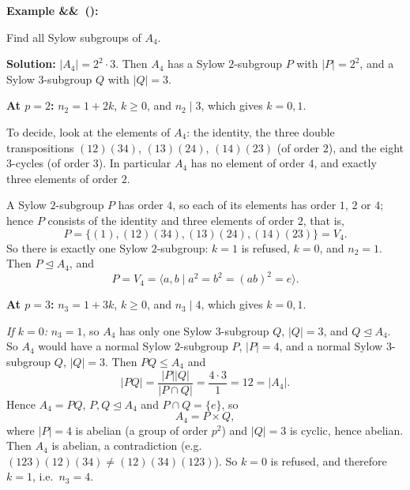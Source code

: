 \documentclass[11pt,a4paper]{article}
\newcounter{examplecnt}[section]
\newenvironment{example}[1][]{
	\stepcounter{examplecnt}
	\begin{examplebox}
		\textbf{\color{exampleColor}Example \arabic{examplecnt}\ifx&#1&\else\ (#1)\fi:} 
	}{
	\end{examplebox}
}
\begin{document}
	
	\begin{example}
		Find all Sylow subgroups of $A_4$.
		
		\vspace{0.5em}
		\noindent \textbf{Solution:} $|A_4| = 2^2 \cdot 3$. Then $A_4$ has a Sylow $2$-subgroup $P$ with $|P| = 2^2$, and a Sylow $3$-subgroup $Q$ with $|Q| = 3$.
		
		\vspace{0.5em}
		\noindent \textbf{At $p = 2$:} $n_2 = 1 + 2k$, $k \geq 0$, and $n_2 \mid 3$, which gives $k = 0, 1$.
		
		\vspace{0.5em}
		\noindent To decide, look at the elements of $A_4$: the identity, the three double transpositions $(12)(34)$, $(13)(24)$, $(14)(23)$ (of order $2$), and the eight $3$-cycles (of order $3$). In particular $A_4$ has no element of order $4$, and exactly three elements of order $2$.
		
		\vspace{0.5em}
		\noindent A Sylow $2$-subgroup $P$ has order $4$, so each of its elements has order $1$, $2$ or $4$; hence $P$ consists of the identity and three elements of order $2$, that is,
		\[
		P = \{(1), (12)(34), (13)(24), (14)(23)\} = V_4 .
		\]
		So there is exactly one Sylow $2$-subgroup: $k = 1$ is refused, $k = 0$, and $n_2 = 1$. Then $P \trianglelefteq A_4$, and
		\[
		P = V_4 = \langle a, b \mid a^2 = b^2 = (ab)^2 = e \rangle.
		\]
		
		\vspace{0.5em}
		\noindent \textbf{At $p = 3$:} $n_3 = 1 + 3k$, $k \geq 0$, and $n_3 \mid 4$, which gives $k = 0, 1$.
		
		\vspace{0.5em}
		\noindent \emph{If $k = 0$:} $n_3 = 1$, so $A_4$ has only one Sylow $3$-subgroup $Q$, $|Q| = 3$, and $Q \trianglelefteq A_4$. So $A_4$ would have a normal Sylow $2$-subgroup $P$, $|P| = 4$, and a normal Sylow $3$-subgroup $Q$, $|Q| = 3$. Then $PQ \leq A_4$ and
		\[
		|PQ| = \frac{|P||Q|}{|P \cap Q|} = \frac{4 \cdot 3}{1} = 12 = |A_4|.
		\]
		Hence $A_4 = PQ$, $P, Q \trianglelefteq A_4$ and $P \cap Q = \{e\}$, so
		\[
		A_4 = P \times Q,
		\]
		where $|P| = 4$ is abelian (a group of order $p^2$) and $|Q| = 3$ is cyclic, hence abelian. Then $A_4$ is abelian, a contradiction (e.g.\ $(123)(12)(34) \neq (12)(34)(123)$). So $k = 0$ is refused, and therefore $k = 1$, i.e.\ $n_3 = 4$.
		

\end{example}
\end{document}
